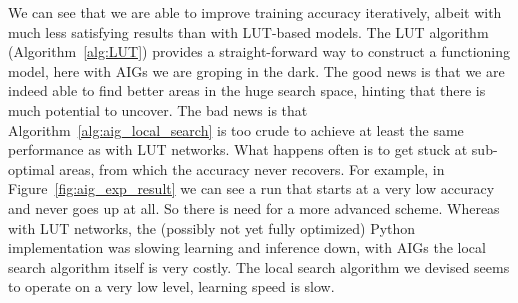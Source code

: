 \noindent We can see that we are able to improve training accuracy iteratively, albeit with much less satisfying results than with LUT-based models. The LUT algorithm (Algorithm~\ref{alg:LUT}) provides a straight-forward way to construct a functioning model, here with AIGs we are groping in the dark. The good news is that we are indeed able to find better areas in the huge search space, hinting that there is much potential to uncover. The bad news is that Algorithm~\ref{alg:aig_local_search} is too crude to achieve at least the same performance as with LUT networks. What happens often is to get stuck at sub-optimal areas, from which the accuracy never recovers. For example, in Figure~\ref{fig:aig_exp_result} we can see a run that starts at a very low accuracy and never goes up at all. So there is need for a more advanced scheme. Whereas with LUT networks, the (possibly not yet fully optimized) Python implementation was slowing learning and inference down, with AIGs the local search algorithm itself is very costly. The local search algorithm we devised seems to operate on a very low level, learning speed is slow.
